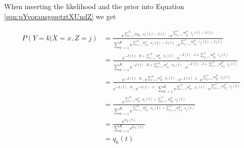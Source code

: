 When inserting the likelihood and the prior into Equation \ref{eqn:pYvorausgesetztXUndZ} we get

\begin{equation}
\begin{split}
P(Y=k|X=x,Z=j) &= \frac{e^{\sum_{i=1}^N w{i}_{ki} \cdot x_i(t) - I(t)} \cdot e^{\sum_{j=1}^J w^{P}_{kj} \cdot z_j(t) - I(t)}}{\sum_{k'=1}^K  e^{\sum_{i=1}^N w^{I}_{k'i} \cdot x_i(t) - I(t)} \cdot e^{\sum_{j=1}^J w^{P}_{k'j} \cdot z_j(t) - I(t)}}\\
&= \frac{e^{-I(t) \cdot N + \sum_{i=1}^N w^{I}_{ki} \cdot x_i(t)} \cdot e^{-I(t) \cdot J + \sum_{j=1}^J w^{P}_{kj} \cdot z_j(t)}}{\sum_{k'=1}^K  e^{-I(t) \cdot N + \sum_{i=1}^N w^{I}_{k'i} \cdot x_i(t)} \cdot e^{-I(t) \cdot J + \sum_{j=1}^J w^{P}_{k'j} \cdot z_j(t)}}\\
&= \frac{e^{-I(t) \cdot N} \cdot e^{\sum_{i=1}^N w^{I}_{ki} \cdot x_i(t)} \cdot e^{-I(t) \cdot J} \cdot e^{\sum_{j=1}^J w^{P}_{kj} \cdot z_j(t)}}{e^{-I(t) \cdot N} \cdot e^{-I(t) \cdot J} \cdot \sum_{k'=1}^K  e^{\sum_{i=1}^N w^{I}_{k'i} \cdot x_i(t)} \cdot e^{\sum_{j=1}^J w^{P}_{k'j} \cdot z_j(t)}}\\
&= \frac{e^{\sum_{i=1}^N w^{I}_{ki} \cdot x_i(t) + \sum_{j=1}^J w^{P}_{kj} \cdot z_j(t)}}{\sum_{k'=1}^K  e^{\sum_{i=1}^N w^{I}_{k'i} \cdot x_i(t) + \sum_{j=1}^J w^{P}_{k'j} \cdot z_j(t)}}\\
&= \frac{e^{U_k(t)}}{\sum_{k'=1}^K e^{U_k'(t)}}\\
&= q_k(t)
\end{split}
\end{equation}


